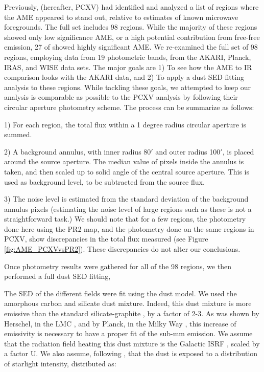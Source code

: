 \documentclass[preprint2,longabstract]{aastex}
\begin{document}
     Previously, \cite{planckXV} (hereafter, PCXV) had identified and analyzed a list of regions where the AME appeared to stand out, relative to estimates of known microwave foregrounds. The full set includes 98 regions. While the majority of these regions showed only low significance AME, or a high potential contribution from free-free emission, 27 of showed highly significant AME. We re-examined the full set of 98 regions, employing data from 19 photometric bands, from the AKARI, Planck, IRAS, and WISE data sets. The major goals are 1) To see how the AME to IR comparison looks with the AKARI data, and 2) To apply a dust SED fitting analysis to these regions. While tackling these goals, we attempted to keep our analysis is comparable as possible to the PCXV analysis by following their circular aperture photometry scheme. The process can be summarize as follows:

     1) For each region, the total flux within a 1 degree radius circular aperture is summed.

     2) A background annulus, with inner radius 80$'$ and outer radius 100$'$, is placed around the source aperture. The median value of pixels inside the annulus is taken, and then scaled up to solid angle of the central source aperture. This is used as background level, to be subtracted from the source flux.

     3) The noise level is estimated from the standard deviation of the background annulus pixels (estimating the noise level of large regions such as these is not a straightforward task.) We should note that for a few regions, the photometry done here using the PR2 map, and the photometry done on the same regions in PCXV, show discrepancies in the total flux measured (see Figure \ref{fig:AME_PCXVvsPR2}). These discrepancies do not alter our conclusions.

     Once photometry results were gathered for all of the 98 regions, we then performed a full dust SED fitting,

The SED of the different fields were fit using the \cite{galliano11} dust model. We used the amorphous carbon and silicate dust mixture. Indeed, this dust mixture is more emissive than the standard silicate-graphite \citep{draine07}, by a factor of 2-3. As was shown by Herschel, in the LMC \citep{galliano11}, and by Planck, in the Milky Way \citep{planck16}, this increase of emissivity is necessary to have a proper fit of the sub-mm emission. We assume that the radiation field heating this dust mixture is the Galactic ISRF \citep{math83}, scaled by a factor U. We also assume, following \cite{dale01}, that the dust is exposed to a distribution of starlight intensity, distributed as:
\end{document}
